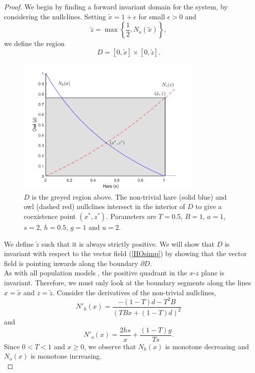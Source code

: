 \documentclass[12pt]{UOthesis}
\theoremstyle{remarkstyle}
\begin{document}
\begin{proof}
We begin by finding a forward invariant domain for the system, by considering the nullclines. Setting $\tilde{x}=1+\epsilon$ for small $\epsilon>0$ and
$$\tilde{z}=\max\left\{\frac{1}{2}, N_o(\tilde{x})\right\},$$
we define the region
$$D=[0,\tilde{x}]\times[0,\tilde{z}].$$

\begin{figure}[h!]
	\centering
	\includegraphics[width=0.8\textwidth]{HOSimpInvariantDomain.png}
	\caption[Invariant domain of the simplified hare--owl system]{$D$ is the greyed region above. The non-trivial hare (solid blue) and owl (dashed red) nullclines intersect in the interior of $D$ to give a coexistence point $(x^*,z^*)$. Parameters are $T=0.5$, $B=1$, $a=1$, $s=2$, $h=0.5$, $g=1$ and $u=2$.\label{HOSimpInvDom}}
\end{figure}

We define $\tilde{z}$ such that it is always strictly positive. We will show that $D$ is invariant with respect to the vector field (\ref{HOsimp}) by showing that the vector field is pointing inwards along the boundary $\partial D$. \\

As with all population models \cite{Kot}, the positive quadrant in the $x$-$z$ plane is invariant. Therefore, we must only look at the boundary segments along the lines $x=\tilde{x}$ and $z=\tilde{z}$. Consider the derivatives of the non-trivial nullclines,
$$N'_h(x)=\frac{-(1-T)d-T^2B}{(TBx+(1-T)d)^2}$$
and
$$N'_o(x)=\frac{2hs}{x}+\frac{(1-T)g}{Ts}.$$
Since $0<T<1$ and $x\ge 0$, we observe that $N_h(x)$ is monotone decreasing and $N_o(x)$ is monotone increasing.\\


\end{proof}
\end{document}
